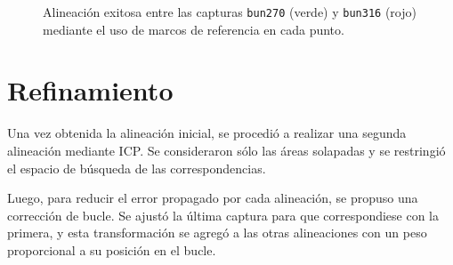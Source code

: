 		\begin{figure}
			\caption{\label{fig:clust_bun_good}Alineación exitosa entre las capturas \texttt{bun270} (verde) y \texttt{bun316} (rojo) mediante el uso de marcos de referencia en cada punto.}
		\end{figure}


	\section{Refinamiento}
	Una vez obtenida la alineación inicial, se procedió a realizar una segunda
	alineación mediante ICP.
	Se consideraron sólo las áreas solapadas y se restringió el
	espacio de búsqueda de las correspondencias.

	Luego, para reducir el error propagado por cada alineación, se propuso una
	corrección de bucle.
	Se ajustó la última captura para que correspondiese con la primera, y
	esta transformación se agregó a las otras alineaciones con un peso
	proporcional a su posición en el bucle.
